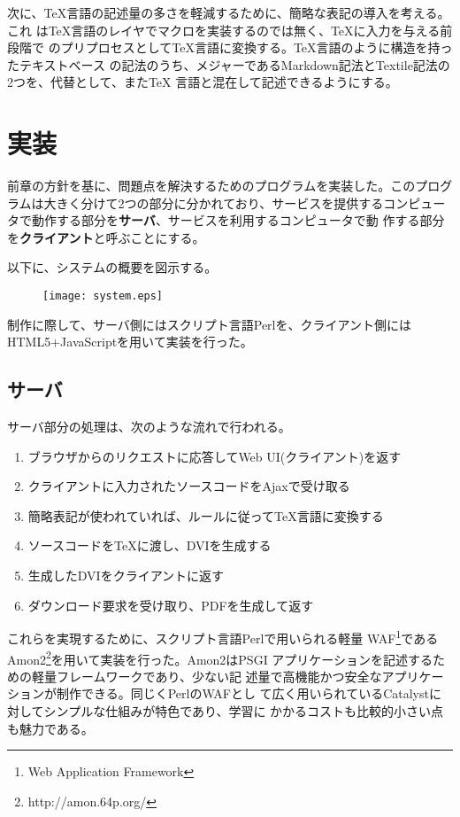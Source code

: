 \documentclass[a4j,9pt,titlepage]{jsarticle}
\begin{document}
次に、TeX言語の記述量の多さを軽減するために、簡略な表記の導入を考える。これ
はTeX言語のレイヤでマクロを実装するのでは無く、TeXに入力を与える前段階で
のプリプロセスとしてTeX言語に変換する。TeX言語のように構造を持ったテキストベース
の記法のうち、メジャーであるMarkdown記法とTextile記法の2つを、代替として、またTeX
言語と混在して記述できるようにする。

\section{実装}
前章の方針を基に、問題点を解決するためのプログラムを実装した。このプログ
ラムは大きく分けて2つの部分に分かれており、サービスを提供するコンピュー
タで動作する部分を{\bfseries サーバ}、サービスを利用するコンピュータで動
作する部分を{\bfseries クライアント}と呼ぶことにする。

以下に、システムの概要を図示する。\\
\begin{figure}[h]
\begin{center}
 \texttt{[image: system.eps]}
\end{center} 
\end{figure}

制作に際して、サーバ側にはスクリプト言語Perlを、クライアント側には
HTML5+JavaScriptを用いて実装を行った。

\subsection{サーバ}
サーバ部分の処理は、次のような流れで行われる。
\begin{enumerate}
 \item ブラウザからのリクエストに応答してWeb UI(クライアント)を返す
 \item クライアントに入力されたソースコードをAjaxで受け取る
 \item 簡略表記が使われていれば、ルールに従ってTeX言語に変換する
 \item ソースコードをTeXに渡し、DVIを生成する 
 \item 生成したDVIをクライアントに返す
 \item ダウンロード要求を受け取り、PDFを生成して返す
\end{enumerate}
これらを実現するために、スクリプト言語Perlで用いられる軽量
WAF\footnote{Web Application Framework}である
Amon2\footnote{http://amon.64p.org/}を用いて実装を行った。Amon2はPSGI
アプリケーションを記述するための軽量フレームワークであり、少ない記
述量で高機能かつ安全なアプリケーションが制作できる。同じくPerlのWAFとし
て広く用いられているCatalystに対してシンプルな仕組みが特色であり、学習に
かかるコストも比較的小さい点も魅力である。\\
\end{document}
